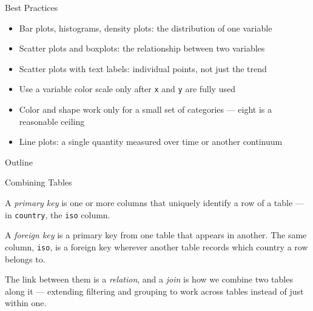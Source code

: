 \documentclass[8pt,aspectratio=169]{beamer}
\begin{document}
\begin{textframe}{Best Practices}

\begin{itemize}
\item Bar plots, histograms, density plots: the distribution of one variable
\item Scatter plots and boxplots: the relationship between two variables
\item Scatter plots with text labels: individual points, not just the trend
\item Use a variable color scale only after \texttt{x} and \texttt{y} are fully used
\item Color and shape work only for a small set of categories --- eight is a reasonable ceiling
\item Line plots: a single quantity measured over time or another continuum
\end{itemize}

\end{textframe}

\begin{outlineframe}{Outline}
\end{outlineframe}


\begin{textframe}{Combining Tables}

A \textit{primary key} is one or more columns that uniquely identify a row of a table --- in \texttt{country}, the \texttt{iso} column.

A \textit{foreign key} is a primary key from one table that appears in another. The same column, \texttt{iso}, is a foreign key wherever another table records which country a row belongs to.

The link between them is a \textit{relation}, and a \textit{join} is how we combine two tables along it --- extending filtering and grouping to work across tables instead of just within one.

\end{textframe}
\end{document}
